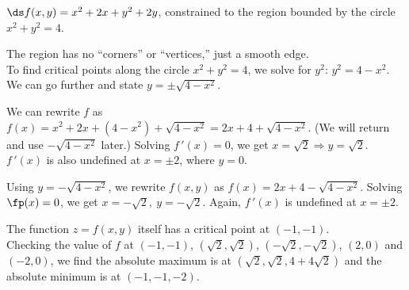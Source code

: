 {$\ds f(x,y) = x^2+2x+y^2+2y$, constrained to the region bounded by the circle $x^2+y^2=4$.
}
{The region has no ``corners'' or ``vertices,'' just a smooth edge.\\
To find critical points along the circle $x^2+y^2=4$, we solve for $y^2$: $y^2=4-x^2$. We can go further and state $y=\pm\sqrt{4-x^2}$. 

We can rewrite $f$ as $f(x)=x^2+2x + (4-x^2) + \sqrt{4-x^2} = 2x+4+\sqrt{4-x^2}$. (We will return and use $-\sqrt{4-x^2}$ later.) Solving $f\,'(x)=0$, we get $x=\sqrt{2} \Rightarrow y=\sqrt{2}$. $f\,'(x)$ is also undefined at $x=\pm 2$, where $y=0$. 

Using $y=-\sqrt{4-x^2}$, we rewrite $f(x,y)$ as $f(x) = 2x+4-\sqrt{4-x^2}$. Solving $\fp(x) =0$, we get $x=-\sqrt{2},\ y=-\sqrt{2}$. Again, $f\,'(x)$ is undefined at $x=\pm 2$.

The function $z=f(x,y)$ itself has a critical point at $(-1,-1)$. \\
Checking the value of $f$ at $(-1,-1)$, $(\sqrt{2},\sqrt{2})$, $(-\sqrt{2},-\sqrt{2})$, $(2,0)$ and $(-2,0)$, we find the absolute maximum is at $(\sqrt2,\sqrt2,4+4\sqrt2)$ and the absolute minimum is at $(-1,-1,-2)$.
}